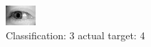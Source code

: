 \begin{figure}[h!]
\begin{center}
\includegraphics[width=0.60\columnwidth]{figures/ID3185_class_3_target_4.png}
\end{center}
\caption{ Classification: 3 actual target: 4}
\label{fig:ID3185_class_3_target_4}
\end{figure}
